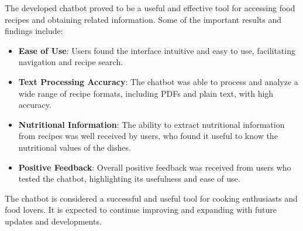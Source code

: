 \documentclass{article}
\begin{document}
The developed chatbot proved to be a useful and effective tool for accessing food recipes and obtaining related information. Some of the important results and findings include:

\begin{itemize}
    \item \textbf{Ease of Use}: Users found the interface intuitive and easy to use, facilitating navigation and recipe search.
    \item \textbf{Text Processing Accuracy}: The chatbot was able to process and analyze a wide range of recipe formats, including PDFs and plain text, with high accuracy.
    \item \textbf{Nutritional Information}: The ability to extract nutritional information from recipes was well received by users, who found it useful to know the nutritional values of the dishes.
    \item \textbf{Positive Feedback}: Overall positive feedback was received from users who tested the chatbot, highlighting its usefulness and ease of use.
\end{itemize}

The chatbot is considered a successful and useful tool for cooking enthusiasts and food lovers. It is expected to continue improving and expanding with future updates and developments.
\end{document}
